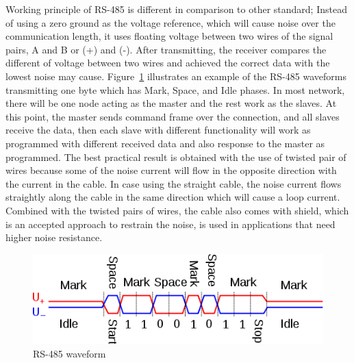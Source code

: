     Working principle of RS-485 is different in comparison to other standard; Instead of using a zero ground as the voltage reference, which will cause noise over the communication length, it uses floating voltage between two wires of the signal pairs, A and B or (+) and (-). After transmitting, the receiver compares the different of voltage between two wires and achieved the correct data with the lowest noise may cause. Figure~\ref{fig:rs485Wave} illustrates an example of the RS-485 waveforms transmitting one byte which has Mark, Space, and Idle phases. In most network, there will be one node acting as the master and the rest work as the slaves. At this point, the master sends command frame over the connection, and all slaves receive the data, then each slave with different functionality will work as programmed with different received data and also response to the master as programmed. The best practical result is obtained with the use of twisted pair of wires because some of the noise current will flow in the opposite direction with the current in the cable. In case using the straight cable, the noise current flows straightly along the cable in the same direction which will cause a loop current. Combined with the twisted pairs of wires, the cable also comes with shield, which is an accepted approach to restrain the noise, is used in applications that need higher noise resistance.
    \begin{figure}[!ht]
      \begin{center}
        \includegraphics[scale=0.8]{images/RS-485_waveform.png}
        \caption{RS-485 waveform}
        \label{fig:rs485Wave}
      \end{center}
    \end{figure}

